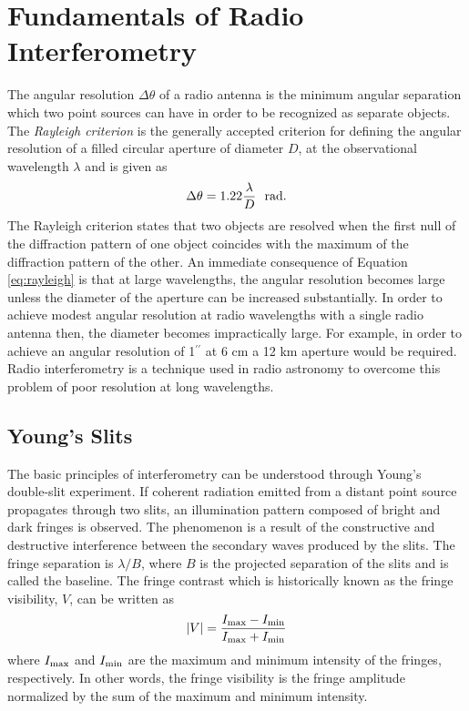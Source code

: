 \section{Fundamentals of Radio Interferometry}\label{sec:3}
The angular resolution $\Delta \theta$ of a radio antenna is the minimum angular separation which two point sources can have in order to be recognized as separate objects. The \textit{Rayleigh criterion} is the generally accepted criterion for defining the angular resolution of a filled circular aperture of diameter $D$, at the observational wavelength $\lambda$ and is given as
\begin{equation}
\Delta \theta=1.22\frac{\lambda}{D} \ \ \rm{rad}.
\label{eq:rayleigh}
\end{equation}
The Rayleigh criterion states that two objects are resolved when the first null of the diffraction pattern of one object coincides with the maximum of the diffraction pattern of the other. An immediate consequence of Equation \ref{eq:rayleigh} is that at large wavelengths, the angular resolution becomes large unless the diameter of the aperture can be increased substantially. In order to achieve modest angular resolution at radio wavelengths with a single radio antenna then, the diameter becomes impractically large. For example, in order to achieve an angular resolution of 1$^{\prime \prime}$ at 6 cm a 12 km aperture would be required. Radio interferometry is a technique used in radio astronomy to overcome this problem of poor resolution at long wavelengths. 

\subsection{Young's Slits}\label{subsec:4}
The basic principles of interferometry can be understood through Young's double-slit experiment. If coherent radiation emitted from a distant point source propagates through two slits, an illumination pattern composed of bright and dark fringes is observed. The phenomenon is a result of the constructive and destructive interference between the secondary waves produced by the slits. The fringe separation is $\lambda /B$, where $B$ is the projected separation of the slits and is called the baseline. The fringe contrast which is historically known as the fringe visibility, $V$, can be written as
\begin{equation}
|V| = \frac{I_{\rm{max}}-I_{\rm{min}}}{I_{\rm{max}} + I_{\rm{min}}}
\end{equation}
where $I_{\rm{max}}$ and $I_{\rm{min}}$ are the maximum and minimum intensity of the fringes, respectively. In other words, the fringe visibility is the fringe amplitude normalized by the sum of the maximum and minimum intensity. 

